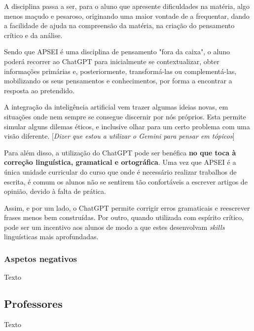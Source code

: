 \documentclass[portuguese, 11pt, a4paper, titlepage, oneside]{article}
\begin{document}
A disciplina passa a ser, para o aluno que apresente dificuldades na matéria, algo menos maçudo e pesaroso, originando uma maior vontade de a frequentar, dando a facilidade de ajuda na compreensão da matéria, na criação do pensamento crítico e da análise.

Sendo que APSEI é uma disciplina de pensamento "fora da caixa", o aluno poderá recorrer ao ChatGPT para inicialmente se contextualizar, obter informações primárias e, posteriormente, transformá-las ou complementá-las, mobilizando os seus pensamentos e conhecimentos, por forma a encontrar a resposta ao pretendido.

A integração da inteligência artificial vem trazer algumas ideias novas, em situações onde nem sempre se consegue discernir por nós próprios. Esta permite simular alguns dilemas éticos, e inclusive olhar para um certo problema com uma visão diferente. [\textit{Dizer que estou a utilizar o Gemini para pensar em tópicos}]

Para além disso, a utilização do ChatGPT pode ser benéfica \textbf{no que toca à correção linguística, gramatical e ortográfica}. Uma vez que APSEI é a única unidade curricular do curso que onde é necessário realizar trabalhos de escrita, é comum os alunos não se sentirem tão confortáveis a escrever artigos de opinião, devido à falta de prática.

Assim, e por um lado, o ChatGPT permite corrigir erros gramaticais e reescrever frases menos bem construídas. Por outro, quando utilizada com espírito crítico, pode ser um incentivo aos alunos de modo a que estes desenvolvam \textit{skills} linguísticas mais aprofundadas.

\subsubsection{Aspetos negativos}
Texto

\subsection{Professores}
Texto
\end{document}
